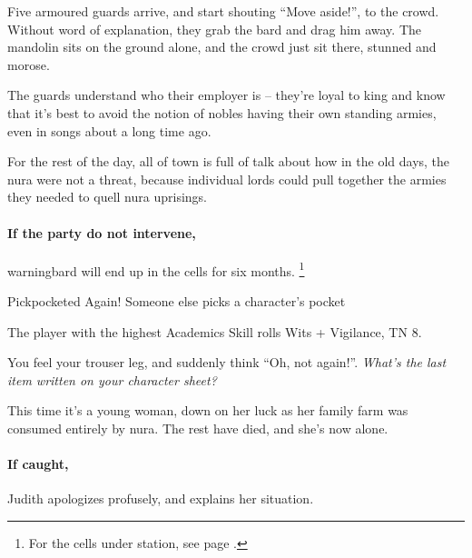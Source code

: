 \begin{multicols}{2}
\begin{boxtext}

	Five armoured guards arrive, and start shouting ``Move aside!'', to the crowd.  Without word of explanation, they grab the bard and drag him away.  The mandolin sits on the ground alone, and the crowd just sit there, stunned and morose.

\end{boxtext}

The guards understand who their employer is -- they're loyal to \gls{king} and know that it's best to avoid the notion of nobles having their own standing armies, even in songs about a long time ago.

For the rest of the day, all of \gls{town} is full of talk about how in the old days, the nura were not a threat, because individual lords could pull together the armies they needed to quell nura uprisings.

\paragraph{If the party do not intervene,}
\gls{warningbard} will end up in the cells for six months.
\footnote{For the cells under  station, see page \pageref{guardstation}.}

\warningbard

{Pickpocketed Again!}%
{Someone else picks a character's pocket}%

The player with the highest Academics Skill rolls Wits + Vigilance, TN 8.

\begin{boxtext}

	You feel your trouser leg, and suddenly think ``Oh, not again!''.  \textit{What's the last item written on your character sheet?}

\end{boxtext}

This time it's a young woman, down on her luck as her family farm was consumed entirely by nura.
The rest have died, and she's now alone.

\paragraph{If caught,}
Judith apologizes profusely, and explains her situation.



\end{multicols}

\stopcontents[Town]
\stopcontents[sq]


